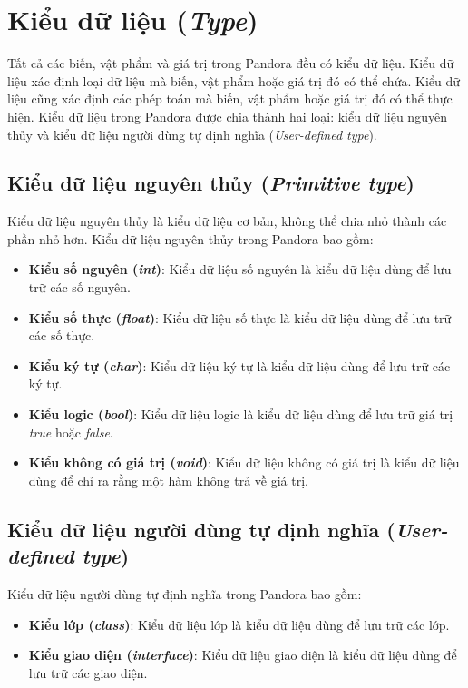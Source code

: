\section{Kiểu dữ liệu (\textit{Type})}

\regexty

Tất cả các biến, vật phẩm và giá trị trong Pandora đều có kiểu dữ liệu. Kiểu dữ liệu xác định loại dữ liệu mà biến, vật phẩm hoặc giá trị đó có thể chứa. Kiểu dữ liệu cũng xác định các phép toán mà biến, vật phẩm hoặc giá trị đó có thể thực hiện. Kiểu dữ liệu trong Pandora được chia thành hai loại: kiểu dữ liệu nguyên thủy và kiểu dữ liệu người dùng tự định nghĩa (\textit{User-defined type}).

\subsection{Kiểu dữ liệu nguyên thủy (\textit{Primitive type})}

Kiểu dữ liệu nguyên thủy là kiểu dữ liệu cơ bản, không thể chia nhỏ thành các phần nhỏ hơn. Kiểu dữ liệu nguyên thủy trong Pandora bao gồm:

\begin{itemize}
    \item \textbf{Kiểu số nguyên (\textit{int})}: Kiểu dữ liệu số nguyên là kiểu dữ liệu dùng để lưu trữ các số nguyên.
    
    \item \textbf{Kiểu số thực (\textit{float})}: Kiểu dữ liệu số thực là kiểu dữ liệu dùng để lưu trữ các số thực.

    \item \textbf{Kiểu ký tự (\textit{char})}: Kiểu dữ liệu ký tự là kiểu dữ liệu dùng để lưu trữ các ký tự.

    \item \textbf{Kiểu logic (\textit{bool})}: Kiểu dữ liệu logic là kiểu dữ liệu dùng để lưu trữ giá trị \textit{true} hoặc \textit{false}.

    \item \textbf{Kiểu không có giá trị (\textit{void})}: Kiểu dữ liệu không có giá trị là kiểu dữ liệu dùng để chỉ ra rằng một hàm không trả về giá trị.
\end{itemize}

\subsection{Kiểu dữ liệu người dùng tự định nghĩa (\textit{User-defined type})}

Kiểu dữ liệu người dùng tự định nghĩa trong Pandora bao gồm:

\begin{itemize}
    \item \textbf{Kiểu lớp (\textit{class})}: Kiểu dữ liệu lớp là kiểu dữ liệu dùng để lưu trữ các lớp.

    \item \textbf{Kiểu giao diện (\textit{interface})}: Kiểu dữ liệu giao diện là kiểu dữ liệu dùng để lưu trữ các giao diện.
\end{itemize}
